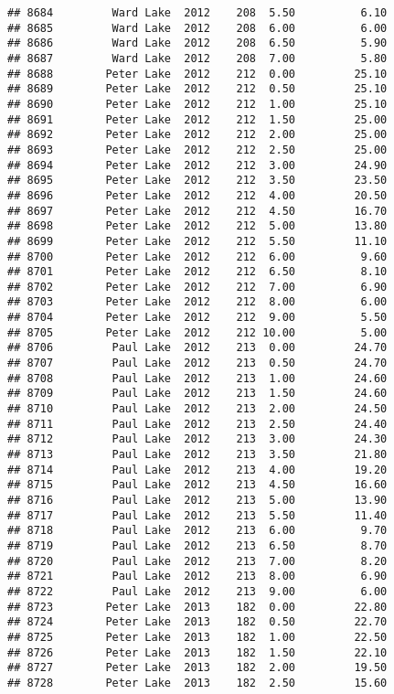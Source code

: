 \documentclass[
]{article}
\begin{document}
\begin{verbatim}
## 8684         Ward Lake  2012    208  5.50          6.10
## 8685         Ward Lake  2012    208  6.00          6.00
## 8686         Ward Lake  2012    208  6.50          5.90
## 8687         Ward Lake  2012    208  7.00          5.80
## 8688        Peter Lake  2012    212  0.00         25.10
## 8689        Peter Lake  2012    212  0.50         25.10
## 8690        Peter Lake  2012    212  1.00         25.10
## 8691        Peter Lake  2012    212  1.50         25.00
## 8692        Peter Lake  2012    212  2.00         25.00
## 8693        Peter Lake  2012    212  2.50         25.00
## 8694        Peter Lake  2012    212  3.00         24.90
## 8695        Peter Lake  2012    212  3.50         23.50
## 8696        Peter Lake  2012    212  4.00         20.50
## 8697        Peter Lake  2012    212  4.50         16.70
## 8698        Peter Lake  2012    212  5.00         13.80
## 8699        Peter Lake  2012    212  5.50         11.10
## 8700        Peter Lake  2012    212  6.00          9.60
## 8701        Peter Lake  2012    212  6.50          8.10
## 8702        Peter Lake  2012    212  7.00          6.90
## 8703        Peter Lake  2012    212  8.00          6.00
## 8704        Peter Lake  2012    212  9.00          5.50
## 8705        Peter Lake  2012    212 10.00          5.00
## 8706         Paul Lake  2012    213  0.00         24.70
## 8707         Paul Lake  2012    213  0.50         24.70
## 8708         Paul Lake  2012    213  1.00         24.60
## 8709         Paul Lake  2012    213  1.50         24.60
## 8710         Paul Lake  2012    213  2.00         24.50
## 8711         Paul Lake  2012    213  2.50         24.40
## 8712         Paul Lake  2012    213  3.00         24.30
## 8713         Paul Lake  2012    213  3.50         21.80
## 8714         Paul Lake  2012    213  4.00         19.20
## 8715         Paul Lake  2012    213  4.50         16.60
## 8716         Paul Lake  2012    213  5.00         13.90
## 8717         Paul Lake  2012    213  5.50         11.40
## 8718         Paul Lake  2012    213  6.00          9.70
## 8719         Paul Lake  2012    213  6.50          8.70
## 8720         Paul Lake  2012    213  7.00          8.20
## 8721         Paul Lake  2012    213  8.00          6.90
## 8722         Paul Lake  2012    213  9.00          6.00
## 8723        Peter Lake  2013    182  0.00         22.80
## 8724        Peter Lake  2013    182  0.50         22.70
## 8725        Peter Lake  2013    182  1.00         22.50
## 8726        Peter Lake  2013    182  1.50         22.10
## 8727        Peter Lake  2013    182  2.00         19.50
## 8728        Peter Lake  2013    182  2.50         15.60

\end{verbatim}
\end{document}
